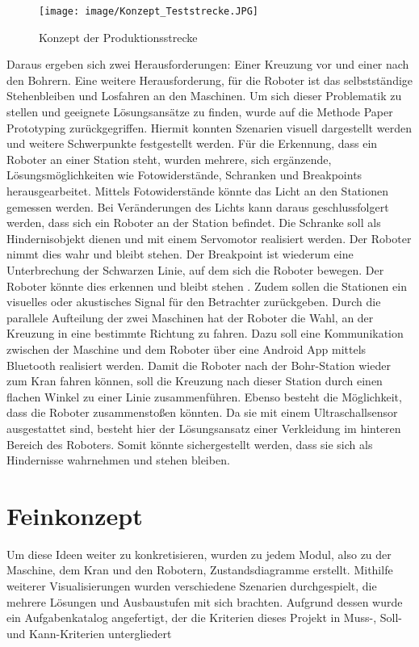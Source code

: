\begin{figure}[h]
	\begin{center}
		\texttt{[image: image/Konzept\_Teststrecke.JPG]}
		\caption{Konzept der Produktionsstrecke}
		\label{Grundidee}
	\end{center}
\end{figure}

Daraus ergeben sich zwei Herausforderungen: Einer Kreuzung vor und einer nach den Bohrern.
Eine weitere Herausforderung, für die Roboter ist das selbstständige Stehenbleiben und Losfahren an den Maschinen. Um sich dieser Problematik zu stellen und geeignete Lösungsansätze zu finden, wurde auf die Methode Paper Prototyping zurückgegriffen. Hiermit konnten Szenarien visuell dargestellt werden und weitere Schwerpunkte festgestellt werden. Für die Erkennung, dass ein
Roboter an einer Station steht, wurden mehrere, sich ergänzende, Lösungsmöglichkeiten wie Fotowiderstände, Schranken und Breakpoints herausgearbeitet. Mittels Fotowiderstände könnte das Licht an den Stationen gemessen werden. Bei Veränderungen des Lichts kann daraus geschlussfolgert werden, dass sich ein Roboter an der Station befindet. Die Schranke soll als Hindernisobjekt dienen und mit einem Servomotor realisiert werden. Der Roboter nimmt dies wahr und bleibt stehen.   
Der Breakpoint ist wiederum eine Unterbrechung der Schwarzen Linie, auf dem sich die Roboter bewegen. Der Roboter könnte dies erkennen und bleibt stehen .  Zudem sollen die Stationen ein visuelles oder akustisches Signal für den Betrachter zurückgeben.  Durch die parallele Aufteilung der zwei Maschinen hat der Roboter die Wahl, an der Kreuzung in eine bestimmte Richtung zu fahren. Dazu soll eine Kommunikation zwischen der Maschine und dem Roboter über eine Android App mittels Bluetooth realisiert werden. Damit die Roboter nach der Bohr-Station wieder zum Kran fahren können, soll die Kreuzung nach dieser Station durch einen flachen Winkel zu einer Linie zusammenführen. Ebenso besteht die Möglichkeit, dass die Roboter zusammenstoßen könnten. Da sie mit einem Ultraschallsensor ausgestattet sind, besteht hier der Lösungsansatz einer Verkleidung im hinteren Bereich des Roboters. Somit könnte sichergestellt werden, dass sie sich als Hindernisse
wahrnehmen und stehen bleiben.

\section{Feinkonzept}
Um diese Ideen weiter zu konkretisieren, wurden zu jedem Modul, also zu der Maschine, dem
Kran und den Robotern, Zustandsdiagramme erstellt. Mithilfe weiterer Visualisierungen wurden verschiedene Szenarien durchgespielt, die mehrere Lösungen und Ausbaustufen mit sich
brachten. Aufgrund dessen wurde ein Aufgabenkatalog angefertigt, der die Kriterien dieses
Projekt in Muss-, Soll- und Kann-Kriterien untergliedert